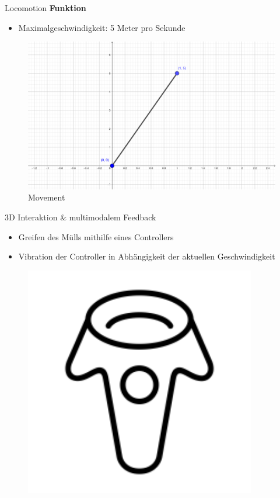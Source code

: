 \documentclass{beamer}
\begin{document}
\begin{frame}{Locomotion}
\textbf{Funktion}
\begin{itemize}
\item Maximalgeschwindigkeit: 5 Meter pro Sekunde
\end{itemize}
\begin{figure}
\centering
\includegraphics[width=.7\textwidth, keepaspectratio]{img/DPV}
\caption{Movement}
\end{figure}
\end{frame}

\begin{frame}{3D Interaktion \& multimodalem Feedback}
\begin{minipage}[c]{0.72\textwidth}
\begin{itemize}
\item Greifen des Mülls mithilfe eines Controllers
\item Vibration der Controller in Abhängigkeit der aktuellen Geschwindigkeit
\end{itemize}
\end{minipage}
\hfill
\begin{minipage}[c]{0.25\textwidth}
\begin{figure}
\centering
\includegraphics[width=0.9\textwidth, keepaspectratio]{img/cont}
\caption{\cite{e}}
\end{figure}
\end{minipage}
\end{frame}
\end{document}
